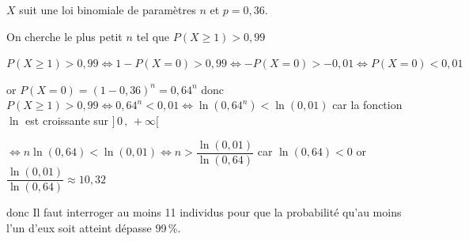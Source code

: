 $X$ suit une loi binomiale de paramètres $n$ et $p=0,36$.

 On cherche le plus petit $n$ tel que $P(X \geqslant 1) > 0,99$


$P(X \geq 1) > 0,99 \iff 1 - P(X = 0) > 0,99 \iff -P(X = 0) >- 0,01 \iff P(X = 0) < 0,01$

or  $P(X = 0) = (1 - 0,36)^n = 0,64^n$ donc  $P(X \geq 1) > 0,99 \iff 0,64^n < 0,01\iff  \ln(0,64^n) < \ln(0,01)$ car la fonction $\ln$ est croissante sur $]\,0\,,\,+\infty[$

$\iff  n \ln(0,64) < \ln(0,01) \iff n > \dfrac{\ln(0,01)}{\ln(0,64)} $ car $\ln(0,64)<0$ or $\dfrac{\ln(0,01)}{\ln(0,64)}\approx 10,32$

donc Il faut interroger au moins 11 individus pour que la probabilité qu'au moins l’un d’eux soit atteint dépasse 99\,\%.

\bigskip
